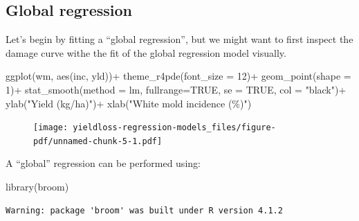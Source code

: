 \documentclass[
  letterpaper,
]{book}
\newenvironment{Shaded}{\begin{snugshade}}{\end{snugshade}}
\newcommand{\AttributeTok}[1]{\textcolor[rgb]{0.40,0.45,0.13}{#1}}
\newcommand{\ConstantTok}[1]{\textcolor[rgb]{0.56,0.35,0.01}{#1}}
\newcommand{\DecValTok}[1]{\textcolor[rgb]{0.68,0.00,0.00}{#1}}
\newcommand{\FunctionTok}[1]{\textcolor[rgb]{0.28,0.35,0.67}{#1}}
\newcommand{\NormalTok}[1]{\textcolor[rgb]{0.00,0.23,0.31}{#1}}
\newcommand{\OtherTok}[1]{\textcolor[rgb]{0.00,0.23,0.31}{#1}}
\newcommand{\SpecialCharTok}[1]{\textcolor[rgb]{0.37,0.37,0.37}{#1}}
\newcommand{\StringTok}[1]{\textcolor[rgb]{0.13,0.47,0.30}{#1}}
\begin{document}
\hypertarget{global-regression}{%
\subsection{Global regression}\label{global-regression}}

Let's begin by fitting a ``global regression'', but we might want to
first inspect the damage curve withe the fit of the global regression
model visually.

\begin{Shaded}
\begin{Highlighting}[]
\FunctionTok{ggplot}\NormalTok{(wm, }\FunctionTok{aes}\NormalTok{(inc, yld))}\SpecialCharTok{+}
      \FunctionTok{theme\_r4pde}\NormalTok{(}\AttributeTok{font\_size =} \DecValTok{12}\NormalTok{)}\SpecialCharTok{+}
       \FunctionTok{geom\_point}\NormalTok{(}\AttributeTok{shape =} \DecValTok{1}\NormalTok{)}\SpecialCharTok{+}
       \FunctionTok{stat\_smooth}\NormalTok{(}\AttributeTok{method =}\NormalTok{ lm, }\AttributeTok{fullrange=}\ConstantTok{TRUE}\NormalTok{, }\AttributeTok{se =} \ConstantTok{TRUE}\NormalTok{, }\AttributeTok{col =} \StringTok{"black"}\NormalTok{)}\SpecialCharTok{+}
       \FunctionTok{ylab}\NormalTok{(}\StringTok{"Yield (kg/ha)"}\NormalTok{)}\SpecialCharTok{+}
       \FunctionTok{xlab}\NormalTok{(}\StringTok{"White mold incidence (\%)"}\NormalTok{)}
\end{Highlighting}
\end{Shaded}

\begin{figure}[H]

{\centering \texttt{[image: yieldloss-regression-models\_files/figure-pdf/unnamed-chunk-5-1.pdf]}

}

\end{figure}

A ``global'' regression can be performed using:

\begin{Shaded}
\begin{Highlighting}[]
\FunctionTok{library}\NormalTok{(broom)}
\end{Highlighting}
\end{Shaded}

\begin{verbatim}
Warning: package 'broom' was built under R version 4.1.2
\end{verbatim}

\begin{Shaded}
\end{Shaded}
\end{document}
